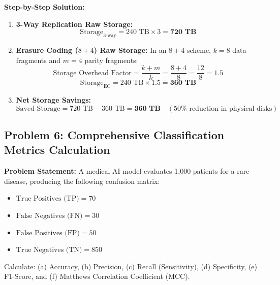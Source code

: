 \textbf{Step-by-Step Solution:}
\begin{enumerate}[label=(\alph*)]
    \item \textbf{3-Way Replication Raw Storage:}
    \[
    \text{Storage}_{\text{3-way}} = 240\text{ TB} \times 3 = \mathbf{720\text{ TB}}
    \]
    \item \textbf{Erasure Coding ($8+4$) Raw Storage:}
    In an $8+4$ scheme, $k = 8$ data fragments and $m = 4$ parity fragments:
    \[
    \text{Storage Overhead Factor} = \frac{k + m}{k} = \frac{8 + 4}{8} = \frac{12}{8} = 1.5
    \]
    \[
    \text{Storage}_{\text{EC}} = 240\text{ TB} \times 1.5 = \mathbf{360\text{ TB}}
    \]
    \item \textbf{Net Storage Savings:}
    \[
    \text{Saved Storage} = 720\text{ TB} - 360\text{ TB} = \mathbf{360\text{ TB}} \quad (50\% \text{ reduction in physical disks})
    \]
\end{enumerate}

\subsection*{Problem 6: Comprehensive Classification Metrics Calculation}
\textbf{Problem Statement:} A medical AI model evaluates 1,000 patients for a rare disease, producing the following confusion matrix:
\begin{itemize}
    \item $\text{True Positives (TP)} = 70$
    \item $\text{False Negatives (FN)} = 30$
    \item $\text{False Positives (FP)} = 50$
    \item $\text{True Negatives (TN)} = 850$
\end{itemize}
Calculate: (a) Accuracy, (b) Precision, (c) Recall (Sensitivity), (d) Specificity, (e) F1-Score, and (f) Matthews Correlation Coefficient (MCC).

